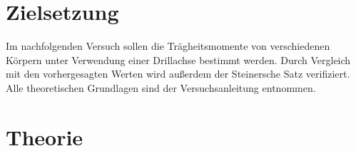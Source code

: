 \section{Zielsetzung}

Im nachfolgenden Versuch sollen die Trägheitsmomente von verschiedenen Körpern unter Verwendung einer Drillachse
bestimmt werden. Durch Vergleich mit den vorhergesagten Werten wird außerdem der Steinersche Satz verifiziert.
Alle theoretischen Grundlagen sind der Versuchsanleitung \cite{träge} entnommen.

\section{Theorie}
\label{sec:theorie}


